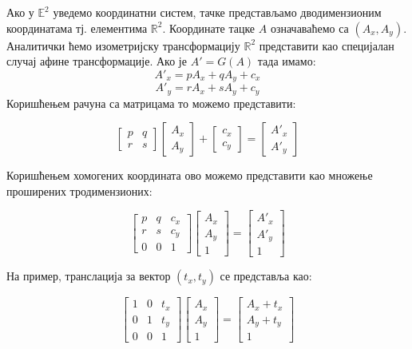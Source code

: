 \documentclass[12pt]{report}
\begin{document}
    Ако у \(\mathbb{E}^2\) уведемо координатни систем, тачке представљамо
дводимензионим координатама тј. елементима \(\mathbb{R}^2\). Координате
тацке \(A\) означаваћемо са \((A_x, A_y)\). Аналитички ћемо изометријску
трансформацију \(\mathbb{R}^2\) представити као специјалан случај
афине трансформације. Ако је \(A' = G(A)\) тада имамо:
\[A'_x = pA_x + qA_y + c_x\] \[A'_y = rA_x + sA_y + c_y\] Коришћењем
рачуна са матрицама то можемо представити:

\[\begin{bmatrix}p & q\\ r & s\end{bmatrix} \begin{bmatrix}A_x\\ A_y \end{bmatrix} + \begin{bmatrix}c_x\\ c_y\end{bmatrix} = \begin{bmatrix}A'_x\\ A'_y \end{bmatrix}\]

Коришћењем хомогених координата ово можемо представити као множење
проширених тродимензионих:

\[\begin{bmatrix}p & q & c_x\\ r & s&c_y \\ 0 & 0 & 1\end{bmatrix} \begin{bmatrix}A_x\\ A_y\\1\end{bmatrix} = 
\begin{bmatrix}A'_x\\ A'_y\\1\end{bmatrix}\]

На пример, транслација за вектор \((t_x, t_y)\) се представља као:

\[\begin{bmatrix}1 & 0 & t_x\\ 0 & 1&t_y \\ 0 & 0 & 1\end{bmatrix} \begin{bmatrix}A_x\\ A_y\\1\end{bmatrix} = 
\begin{bmatrix}A_x+t_x\\ A_y+t_y\\1\end{bmatrix}\]
\end{document}
